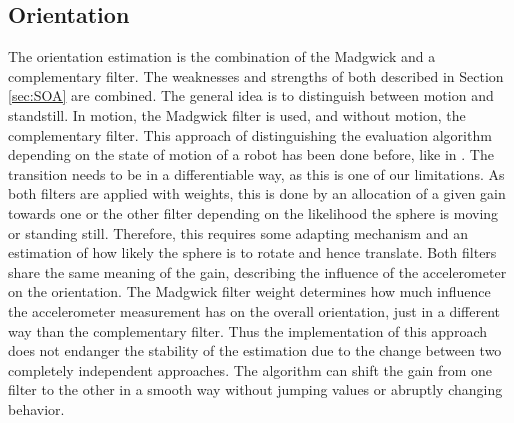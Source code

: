 \documentclass[letterpaper, 10 pt, conference]{ieeeconf}  %
\begin{document}
\subsection{Orientation}
The orientation estimation is the combination of the Madgwick and a complementary filter.
The weaknesses and strengths of both described in Section \ref{sec:SOA} are combined. 
The general idea is to distinguish between motion and standstill.
In motion, the Madgwick filter is used, and without motion, the complementary filter.
This approach of distinguishing the evaluation algorithm depending on the state of motion of a robot has been done before, like in \cite{Hertzberg2012}.
The transition needs to be in a differentiable way, as this is one of our limitations.  
As both filters are applied with weights, this is done by an allocation of a given gain towards one or the other filter depending on the likelihood the sphere is moving or standing still. 
Therefore, this requires some adapting mechanism and an estimation of how likely the sphere is to rotate and hence translate.
Both filters share the same meaning of the gain, describing the influence of the accelerometer on the orientation.
The Madgwick filter weight determines how much influence the accelerometer measurement has on the overall orientation, just in a different way than the complementary filter.
Thus the implementation of this approach does not endanger the stability of the estimation due to the change between two completely independent approaches.
The algorithm can shift the gain from one filter to the other in a smooth way without jumping values or abruptly changing behavior. 
\end{document}
